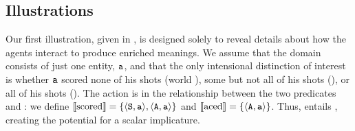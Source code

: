 \documentclass[leqno]{article}
\begin{document}

\subsection{Illustrations}

Our first illustration, given in , is
designed solely to reveal details about how the agents interact to
produce enriched meanings. We assume that the domain consists of just
one entity, $\texttt{a}$, and that the only intensional distinction of
interest is whether $\texttt{a}$ scored none of his shots (world
), some but not all of his shots (), or all of his
shots (). The action is in the relationship between the two
predicates  and : we define $\llbracket\text{scored}\rrbracket =
\left\{ \langle \texttt{S}, \texttt{a} \rangle, \langle \texttt{A}, \texttt{a} \rangle \right\}$ and
$\llbracket\text{aced}\rrbracket = \left\{ \langle \texttt{A}, \texttt{a} \rangle \right\}$. Thus, 
entails , creating the potential for a scalar
implicature.
\end{document}
